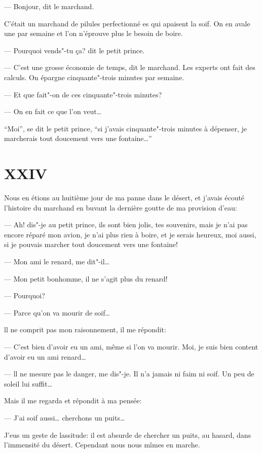 \begin{Parallel}[p]{}{}
{--- Bonjour, dit le marchand.

C'était un marchand de pilules perfectionné es qui apaisent la soif. On en avale une
par semaine et l'on n'éprouve plus le besoin de boire.

--- Pourquoi vends"-tu ça? dit le petit prince.

--- C'est une grosse économie de temps, dit le marchand. Les experts ont fait des
calculs. On épargne cinquante"-trois minutes par semaine.

--- Et que fait"-on de ces cinquante"-trois minutes?

--- On en fait ce que l'on veut\ldots{}

``Moi'', se dit le petit prince, ``si j'avais cinquante"-trois minutes à dépenser, je
marcherais tout doucement vers une fontaine\ldots{}''

\section{XXIV}

Nous en étions au huitième jour de ma panne dans le désert, et j'avais écouté
l'histoire du marchand en buvant la dernière goutte de ma provision d'eau:

--- Ah! dis"-je au petit prince, ils sont bien jolis, tes souvenirs, mais je n'ai
pas encore réparé mon avion, je n'ai plus rien à boire, et je serais heureux, moi
aussi, si je pouvais marcher tout doucement vers une fontaine!

--- Mon ami le renard, me dit"-il\ldots{}

--- Mon petit bonhomme, il ne s'agit plus du renard!

--- Pourquoi?

--- Parce qu'on va mourir de soif\ldots{}

ll ne comprit pas mon raisonnement, il me répondit:

--- C'est bien d'avoir eu un ami, même si l'on va mourir. Moi, je suis bien content
d'avoir eu un ami renard\ldots{}

--- ll ne mesure pas le danger, me dis"-je. Il n'a jamais ni faim ni soif. Un peu
de soleil lui suffit\ldots{}

Mais il me regarda et répondit à ma pensée:

--- J'ai soif aussi\ldots{} cherchons un puits\ldots{}

J'eus un geste de lassitude: il est absurde de chercher un puits, au hasard, dans
l'immensité du désert. Cependant nous nous mîmes en marche.

}
\end{Parallel}
